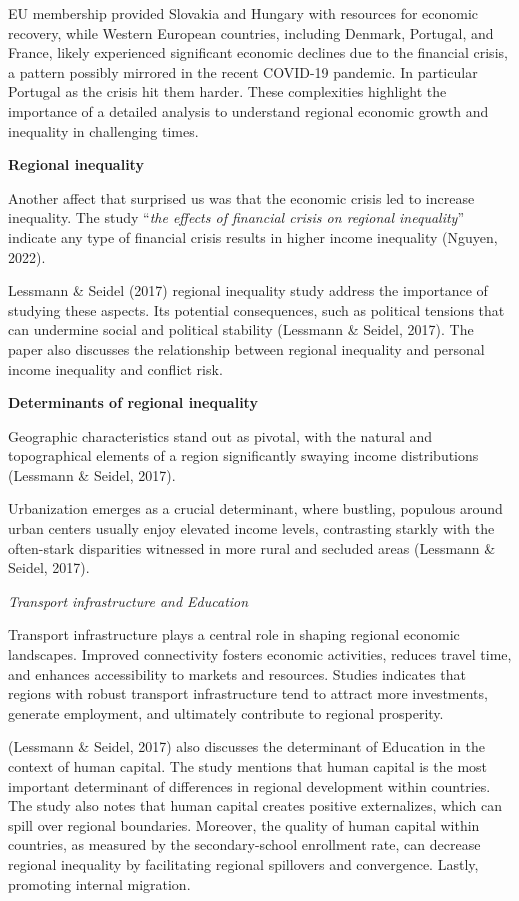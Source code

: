 \documentclass[
  a4paper,
  DIV=11,
  numbers=noendperiod]{scrartcl}
\begin{document}
EU membership provided Slovakia and Hungary with resources for economic
recovery, while Western European countries, including Denmark, Portugal,
and France, likely experienced significant economic declines due to the
financial crisis, a pattern possibly mirrored in the recent COVID-19
pandemic. In particular Portugal as the crisis hit them harder. These
complexities highlight the importance of a detailed analysis to
understand regional economic growth and inequality in challenging times.

\textbf{Regional inequality}

Another affect that surprised us was that the economic crisis led to
increase inequality. The study ``\emph{the effects of financial crisis
on regional inequality}'' indicate any type of financial crisis results
in higher income inequality (Nguyen, 2022).

Lessmann \& Seidel (2017) regional inequality study address the
importance of studying these aspects. Its potential consequences, such
as political tensions that can undermine social and political stability
(Lessmann \& Seidel, 2017). The paper also discusses the relationship
between regional inequality and personal income inequality and conflict
risk.

\textbf{Determinants of regional inequality}

Geographic characteristics stand out as pivotal, with the natural and
topographical elements of a region significantly swaying income
distributions (Lessmann \& Seidel, 2017).

Urbanization emerges as a crucial determinant, where bustling, populous
around urban centers usually enjoy elevated income levels, contrasting
starkly with the often-stark disparities witnessed in more rural and
secluded areas (Lessmann \& Seidel, 2017).

\emph{Transport infrastructure and Education}

Transport infrastructure plays a central role in shaping regional
economic landscapes. Improved connectivity fosters economic activities,
reduces travel time, and enhances accessibility to markets and
resources. Studies indicates that regions with robust transport
infrastructure tend to attract more investments, generate employment,
and ultimately contribute to regional prosperity.

(Lessmann \& Seidel, 2017) also discusses the determinant of Education
in the context of human capital. The study mentions that human capital
is the most important determinant of differences in regional development
within countries. The study also notes that human capital creates
positive externalizes, which can spill over regional boundaries.
Moreover, the quality of human capital within countries, as measured by
the secondary-school enrollment rate, can decrease regional inequality
by facilitating regional spillovers and convergence. Lastly, promoting
internal migration.
\end{document}
